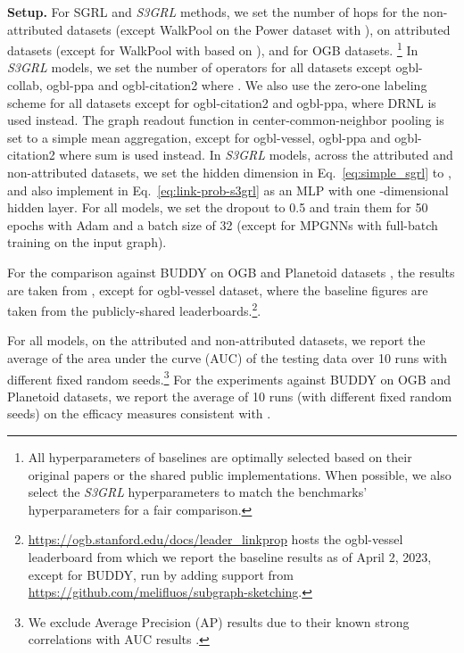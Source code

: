 \documentclass[sigconf, nonacm]{acmart}
\newcommand{\ssgrl}{\textit{S3GRL}\xspace}
\begin{document}
\vskip 1mm
\noindent \textbf{Setup.} For SGRL and \ssgrl methods, we set the number of hops  for the non-attributed datasets (except WalkPool on the Power dataset with ),  on attributed datasets (except for WalkPool with  based on \cite{pan2022neural}), and  for OGB datasets. \footnote{All hyperparameters of baselines are optimally selected based on their original papers or the shared public implementations. When possible, we also select the \ssgrl hyperparameters to match the benchmarks' hyperparameters for a fair comparison.} In \ssgrl models, we set the number of operators  for all datasets except ogbl-collab, ogbl-ppa and ogbl-citation2 where . We also use the zero-one labeling scheme for all datasets except for ogbl-citation2 and ogbl-ppa, where DRNL is used instead. The  graph readout function in center-common-neighbor pooling is set to a simple mean aggregation, except for ogbl-vessel, ogbl-ppa and ogbl-citation2 where sum is used instead. In \ssgrl models, across the attributed and non-attributed datasets, we set the hidden dimension in Eq.~\ref{eq:simple_sgrl} to , and also implement  in Eq.~\ref{eq:link-prob-s3grl} as an MLP with one -dimensional hidden layer. For all models, we set the dropout to 0.5 and train them for 50 epochs with Adam \cite{kingma2014adam} and a batch size of 32 (except for MPGNNs with full-batch training on the input graph).





For the comparison against BUDDY on OGB and Planetoid datasets \cite{yang2016revisiting}, the results are taken from \cite{chamberlain2023graph}, except for ogbl-vessel dataset, where the baseline figures are taken from the publicly-shared leaderboards.\footnote{\href{https://ogb.stanford.edu/docs/leader\_linkprop}{https://ogb.stanford.edu/docs/leader\_linkprop} hosts the ogbl-vessel leaderboard from which we report the baseline results as of April 2, 2023, except for BUDDY, run by adding support from \href{https://github.com/melifluos/subgraph-sketching}{https://github.com/melifluos/subgraph-sketching}.}.





For all models, on the attributed and non-attributed datasets, we report the average of the area under the curve (AUC) of the testing data over 10 runs with different fixed random seeds.\footnote{We exclude Average Precision (AP) results due to their known strong correlations with AUC results \cite{pan2022neural}.} 
For the experiments against BUDDY on OGB and Planetoid datasets, we report the average of 10 runs (with different fixed random seeds) on the efficacy measures consistent with \cite{chamberlain2023graph}.
\end{document}
